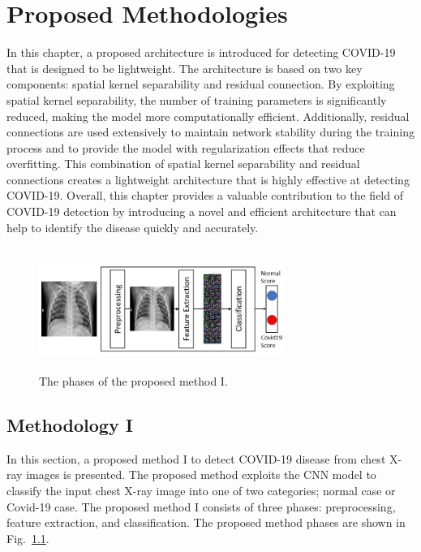 
\chapter{Proposed Methodologies} %

\label{chp:proposed1} %
In this chapter, a proposed architecture is introduced for detecting COVID-19 that is designed to be lightweight. The architecture is based on two key components: spatial kernel separability and residual connection. By exploiting spatial kernel separability, the number of training parameters is significantly reduced, making the model more computationally efficient. Additionally, residual connections are used extensively to maintain network stability during the training process and to provide the model with regularization effects that reduce overfitting. This combination of spatial kernel separability and residual connections creates a lightweight architecture that is highly effective at detecting COVID-19. Overall, this chapter provides a valuable contribution to the field of COVID-19 detection by introducing a novel and efficient architecture that can help to identify the disease quickly and accurately. 

\begin{figure}[th]
    \centering
    \includegraphics[height=40mm,width=8.0cm]{Figures/fig1.jpg}
    \caption{The phases of the proposed method I.}
    \label{fig1}
    \end{figure}

\section{Methodology I}
In this section, a  proposed method I to detect COVID-19 disease from chest X-ray images is presented. The proposed method exploits the CNN model to classify the input chest X-ray image into one of two categories; normal case or Covid-19 case. The proposed method I consists of three phases: preprocessing, feature extraction, and classification. The proposed method phases are shown in Fig.~\ref{fig1}. 

